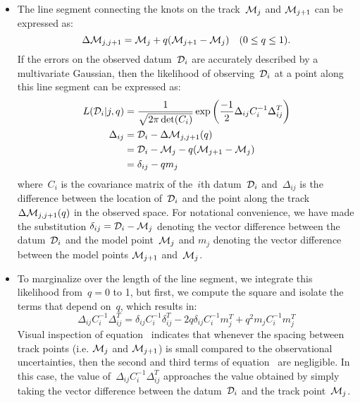 \documentclass[ms.tex]{subfiles}
\begin{document}
\begin{itemize}
	\item The line segment connecting the knots on the track~$\mathcal{M}_j$ and
	$\mathcal{M}_{j + 1}$ can be expressed as:
	\begin{equation}
	\Delta\mathcal{M}_{j,j + 1} = \mathcal{M}_j + q(\mathcal{M}_{j + 1} -
	\mathcal{M}_j) \quad (0 \leq q \leq 1).
	\end{equation}
	If the errors on the observed datum~$\mathcal{D}_i$ are accurately described
	by a multivariate Gaussian, then the likelihood of observing~$\mathcal{D}_i$
	at a point along this line segment can be expressed as:
	\begin{subequations}\begin{align}
	L(\mathcal{D}_i | j, q) &=
	\frac{1}{\sqrt{2\pi \det(C_i)}}
	\exp\left(\frac{-1}{2}\Delta_{ij} C_{i}^{-1} \Delta_{ij}^T\right)
	\\
	\Delta_{ij} &= \mathcal{D}_i - \Delta\mathcal{M}_{j,j + 1}(q)
	\\
	&= \mathcal{D}_i - \mathcal{M}_j - q(\mathcal{M}_{j + 1} - \mathcal{M}_j)
	\label{eq:delta_segment}
	\\
	&= \delta_{ij} - q m_j
	\end{align}\end{subequations}
	where~$C_i$ is the covariance matrix of the~$i$th datum~$\mathcal{D}_i$
	and~$\Delta_{ij}$ is the difference between the location of~$\mathcal{D}_i$
	and the point along the track~$\Delta\mathcal{M}_{j,j + 1}(q)$ in the
	observed space.
	For notational convenience, we have made the substitution
	$\delta_{ij} = \mathcal{D}_i - \mathcal{M}_j$ denoting the vector difference
	between the datum~$\mathcal{D}_i$ and the model point~$\mathcal{M}_j$ and
	$m_j$ denoting the vector difference between the model points
	$\mathcal{M}_{j + 1}$ and~$\mathcal{M}_j$.

	\item To marginalize over the length of the line segment, we integrate
	this likelihood from~$q = 0$ to 1, but first, we compute the square and
	isolate the terms that depend on~$q$, which results in:
	\begin{equation}
	\label{eq:chi_squared_ij}
	\Delta_{ij}C_i^{-1}\Delta_{ij}^T = 
	\delta_{ij}C_i^{-1}\delta_{ij}^T - 2q \delta_{ij} C_i^{-1} m_j^T +
	q^2 m_j C_i^{-1} m_j^T
	\end{equation}
	Visual inspection of equation~ indicates that
	whenever the spacing between track points (i.e. $\mathcal{M}_{j}$ and
	$\mathcal{M}_{j + 1}$) is small compared to the observational uncertainties,
	then the second and third terms of equation~ are
	negligible.
	In this case, the value of~$\Delta_{ij}C_i^{-1}\Delta_{ij}^T$ approaches
	the value obtained by simply taking the vector difference between the
	datum~$\mathcal{D}_i$ and the track point~$\mathcal{M}_j$.


\end{itemize}
\end{document}
